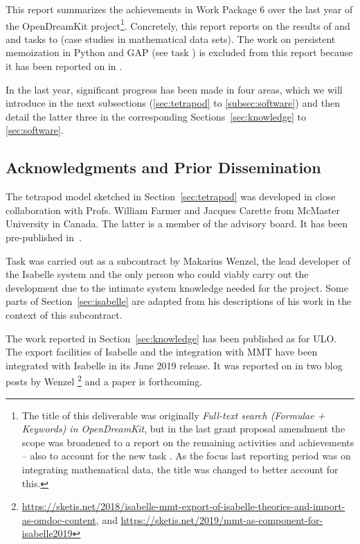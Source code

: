 This report summarizes the achievements in Work Package 6 over the last year of the OpenDreamKit project\footnote{The title of this deliverable was originally \emph{Full-text search (Formulae + Keywords) in OpenDreamKit}, but in the last grant proposal amendment the scope was broadened to a report on the remaining  activities and achievements -- also to account for the new task . As the focus last reporting period was on integrating mathematical data, the title was changed to better account for this.}. Concretely, this report reports on the results of  and  and tasks  to  (case studies in mathematical data sets). The work on persistent memoization in Python and GAP (see task ) is excluded from this report because it has been reported on in .

In the last year, significant progress has been made in four areas, which we will introduce in the next subsections (\ref{sec:tetrapod} to \ref{subsec:software}) and then detail the latter three in the corresponding Sections~\ref{sec:knowledge} to \ref{sec:software}.






\subsection{Acknowledgments and Prior Dissemination}
The tetrapod model sketched in Section~\ref{sec:tetrapod} was developed in close collaboration with Profs. William Farmer and Jacques Carette from McMaster University in Canada.
The latter is a member of the \pn advisory board. It has been pre-published in~\cite{CarFarKohRab:bmobb19}.

Task  was carried out as a subcontract by Makarius Wenzel, the lead developer of the Isabelle system and the only person who could viably carry out the development due to the intimate system knowledge needed for the project.
Some parts of Section~\ref{sec:isabelle} are adapted from his descriptions of his work in the context of this subcontract.

The work reported in Section~\ref{sec:knowledge} has been published as \cite{ConKohMue:rdaml19} for ULO.
The export facilities of Isabelle and the integration with MMT have been integrated with Isabelle in its June 2019 release.
It was reported on in two blog posts by Wenzel%
\footnote{\url{https://sketis.net/2018/isabelle-mmt-export-of-isabelle-theories-and-import-as-omdoc-content}, and \url{https://sketis.net/2019/mmt-as-component-for-isabelle2019}}
and a paper is forthcoming.

